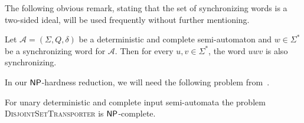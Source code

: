 \begin{toappendix}
The following obvious remark, stating that the set of synchronizing words
is a two-sided ideal, will be used frequently without further mentioning.

\begin{lemma}
	\label{lem:append_sync} %
	Let $\mathcal A = (\Sigma, Q, \delta)$ be a deterministic and complete semi-automaton and $w\in \Sigma^*$ be a synchronizing word for $\mathcal A$. Then for every $u, v \in \Sigma^*$, the word $uwv$ is also synchronizing. %
\end{lemma}
\end{toappendix}



In our $\textsf{NP}$-hardness reduction, we will need the following problem
from~\cite{DBLP:conf/ictcs/Hoffmann20}.

\begin{decproblem}\label{def:unary_set_transpoer}
\end{decproblem}


\begin{theorem}
\label{prop:set_transporter_np_complete}
 For unary deterministic and complete input semi-automata the problem \textsc{DisjointSetTransporter}
 is $\textsf{NP}$-complete.
\end{theorem}


 

